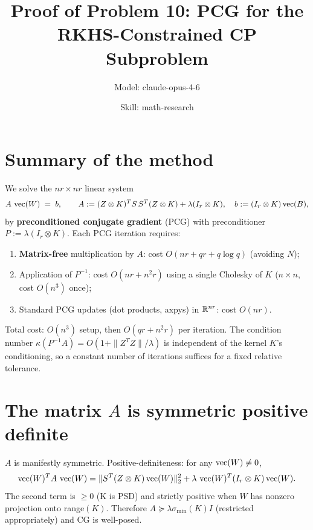 

\title{Proof of Problem 10: PCG for the RKHS-Constrained CP Subproblem}
\author{Model: claude-opus-4-6 \and Skill: math-research}
\date{}

\newtheorem{theorem}{Theorem}
\newtheorem{lemma}[theorem]{Lemma}
\newtheorem{proposition}[theorem]{Proposition}


\maketitle

\section*{Summary of the method}

We solve the $nr\times nr$ linear system
\begin{equation}\label{eq:sys}
   A\,\operatorname{vec}(W) \;=\; b,\qquad A := (Z\otimes K)^T S\,S^T(Z\otimes K) + \lambda(I_r\otimes K),\quad b:=(I_r\otimes K)\operatorname{vec}(B),
\end{equation}
by \textbf{preconditioned conjugate gradient} (PCG) with preconditioner $P := \lambda(I_r\otimes K)$. Each PCG iteration requires:
\begin{enumerate}
\item \textbf{Matrix-free} multiplication by $A$: cost $O(nr + qr + q\log q)$ (avoiding $N$);
\item Application of $P^{-1}$: cost $O(nr + n^2 r)$ using a single Cholesky of $K$ ($n\times n$, cost $O(n^3)$ once);
\item Standard PCG updates (dot products, axpys) in $\mathbb{R}^{nr}$: cost $O(nr)$.
\end{enumerate}
Total cost: $O(n^3)$ setup, then $O(qr + n^2 r)$ per iteration. The condition number $\kappa(P^{-1}A)=O(1+\|Z^TZ\|/\lambda)$ is independent of the kernel $K$'s conditioning, so a constant number of iterations suffices for a fixed relative tolerance.

\section{The matrix $A$ is symmetric positive definite}

$A$ is manifestly symmetric. Positive-definiteness: for any $\operatorname{vec}(W)\neq 0$,
\[
   \operatorname{vec}(W)^T A\,\operatorname{vec}(W) = \|S^T(Z\otimes K)\operatorname{vec}(W)\|_2^2 + \lambda\,\operatorname{vec}(W)^T(I_r\otimes K)\operatorname{vec}(W).
\]
The second term is $\geq 0$ (K is PSD) and strictly positive when $W$ has nonzero projection onto range$(K)$. Therefore $A\succeq \lambda\sigma_{\min}(K) I$ (restricted appropriately) and CG is well-posed.

